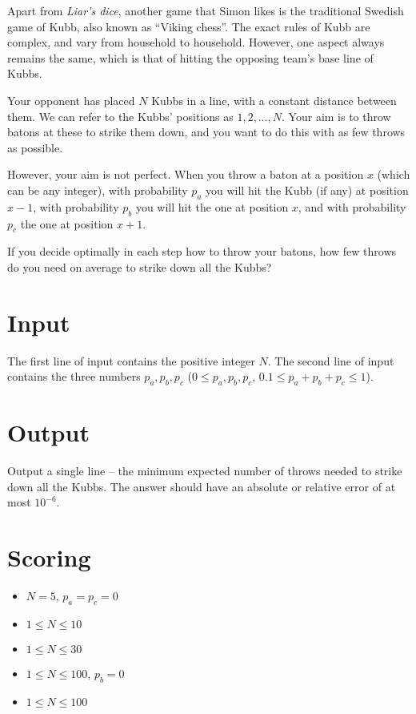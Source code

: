 Apart from \emph{Liar's dice}, another game that Simon likes is the traditional Swedish game of Kubb,
also known as ``Viking chess''.
The exact rules of Kubb are complex, and vary from household to household.
However, one aspect always remains the same, which is that of hitting the opposing team's base line of Kubbs.

Your opponent has placed $N$ Kubbs in a line, with a constant distance between them.
We can refer to the Kubbs' positions as $1, 2, \dots, N$.
Your aim is to throw batons at these to strike them down, and
you want to do this with as few throws as possible.

However, your aim is not perfect. When you throw a baton at a position $x$ (which can be any integer),
with probability $p_a$ you will hit the Kubb (if any) at position $x-1$,
with probability $p_b$ you will hit the one at position $x$, and
with probability $p_c$ the one at position $x+1$.

If you decide optimally in each step how to throw your batons,
how few throws do you need on average to strike down all the Kubbs?

\section*{Input}
The first line of input contains the positive integer $N$.
The second line of input contains the three numbers $p_a, p_b, p_c$ ($0 \le p_a, p_b, p_c$, $0.1 \le p_a + p_b + p_c \le 1$).

\section*{Output}
Output a single line -- the minimum expected number of throws needed to strike down all the Kubbs.
The answer should have an absolute or relative error of at most $10^{-6}$.

\section*{Scoring}
\begin{itemize}
  \item $N = 5$, $p_a = p_c = 0$
  \item $1 \le N \le 10$
  \item $1 \le N \le 30$
  \item $1 \le N \le 100$, $p_b = 0$
  \item $1 \le N \le 100$
\end{itemize}

